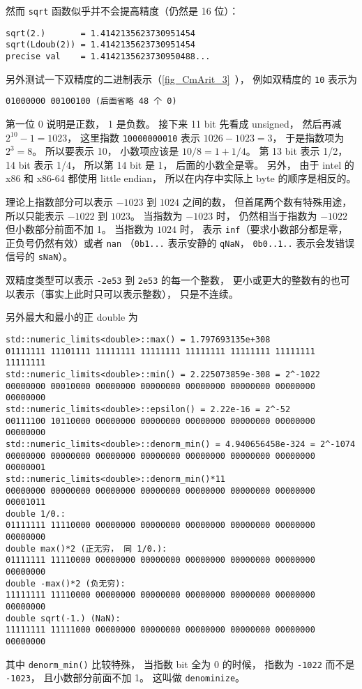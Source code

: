 然而 \verb|sqrt| 函数似乎并不会提高精度（仍然是 16 位）：
\begin{lstlisting}[language=none]
sqrt(2.)       = 1.4142135623730951454
sqrt(Ldoub(2)) = 1.4142135623730951454
precise val    = 1.4142135623730950488...
\end{lstlisting}

另外测试一下双精度的二进制表示（\autoref{fig_CmArit_3}~）， 例如双精度的 \verb|10| 表示为
\begin{lstlisting}[language=none]
01000000 00100100 (后面省略 48 个 0)
\end{lstlisting}
第一位 0 说明是正数， 1 是负数。 接下来 11 bit 先看成 unsigned， 然后再减 $2^{10}-1 = 1023$， 这里指数 \verb|10000000010| 表示 $1026-1023 = 3$， 于是指数项为 $2^{3} = 8$。 所以要表示 10， 小数项应该是 $10/8 = 1+1/4$。 第 13 bit 表示 1/2， 14 bit 表示 1/4， 所以第 14 bit 是 1， 后面的小数全是零。 另外， 由于 intel 的 x86 和 x86-64 都使用 little endian， 所以在内存中实际上 byte 的顺序是相反的。

理论上指数部分可以表示 $-1023$ 到 $1024$ 之间的数， 但首尾两个数有特殊用途， 所以只能表示 $-1022$ 到 $1023$。 当指数为 $-1023$ 时， 仍然相当于指数为 $-1022$ 但小数部分前面不加 1。 当指数为 $1024$ 时， 表示 \verb|inf|（要求小数部分都是零， 正负号仍然有效）或者 \verb|nan| （\verb|0b1...| 表示安静的 \verb|qNaN|， \verb|0b0..1..| 表示会发错误信号的 \verb|sNaN|）。

双精度类型可以表示 \verb|-2e53| 到 \verb|2e53| 的每一个整数， 更小或更大的整数有的也可以表示（事实上此时只可以表示整数）， 只是不连续。

另外最大和最小的正 double 为
\begin{lstlisting}[language=none]
std::numeric_limits<double>::max() = 1.797693135e+308
01111111 11101111 11111111 11111111 11111111 11111111 11111111 11111111
std::numeric_limits<double>::min() = 2.225073859e-308 = 2^-1022
00000000 00010000 00000000 00000000 00000000 00000000 00000000 00000000
std::numeric_limits<double>::epsilon() = 2.22e-16 = 2^-52
00111100 10110000 00000000 00000000 00000000 00000000 00000000 00000000
std::numeric_limits<double>::denorm_min() = 4.940656458e-324 = 2^-1074
00000000 00000000 00000000 00000000 00000000 00000000 00000000 00000001
std::numeric_limits<double>::denorm_min()*11
00000000 00000000 00000000 00000000 00000000 00000000 00000000 00001011
double 1/0.:
01111111 11110000 00000000 00000000 00000000 00000000 00000000 00000000
double max()*2 (正无穷， 同 1/0.):
01111111 11110000 00000000 00000000 00000000 00000000 00000000 00000000
double -max()*2 (负无穷):
11111111 11110000 00000000 00000000 00000000 00000000 00000000 00000000
double sqrt(-1.) (NaN):
11111111 11111000 00000000 00000000 00000000 00000000 00000000 00000000
\end{lstlisting}
其中 \verb|denorm_min()| 比较特殊， 当指数 bit 全为 0 的时候， 指数为 \verb|-1022| 而不是 \verb|-1023|， 且小数部分前面不加 1。 这叫做 \verb|denominize|。

